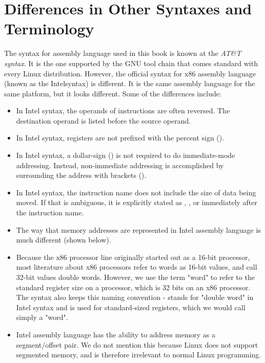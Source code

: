 \section{Differences in Other Syntaxes and Terminology}

The syntax for assembly language used in this book is known at the
\emph{AT\&T syntax}.  It is the one supported by the 
GNU tool chain that comes standard with every Linux distribution.  However,
the official syntax for x86 assembly language (known as the Intel\textregistered syntax)
is different.  It is
the same assembly language for the same platform, but it looks different.
Some of the differences include:

\begin{itemize}\item In Intel syntax, the operands of instructions are often reversed.  The destination operand is listed before the source operand. 
\item In Intel syntax, registers are not prefixed with the percent sign (\icode{\%}). 
\item In Intel syntax, a dollar-sign (\icode{\$}) is not required to do immediate-mode addressing.  Instead, non-immediate addressing is accomplished by surrounding the address with brackets (\icode{[]}). 
\item In Intel syntax, the instruction name does not include the size of data being moved.  If that is ambiguous, it is explicitly stated as , , or  immediately after the instruction name. 
\item The way that memory addresses are represented in Intel assembly language is much different (shown below). 
\item Because the x86 processor line originally started out as a 16-bit processor, most literature about x86 processors refer to words as 16-bit values, and call 32-bit values double words.  However, we use the term "word" to refer to the standard register size on a processor, which is 32 bits on an x86 processor.  The syntax also keeps this naming convention -  stands for "double word" in Intel syntax and is used for standard-sized registers, which we would call simply a "word". 
\item Intel assembly language has the ability to address memory as a segment/offset pair.  We do not mention this because Linux does not support segmented memory, and is therefore irrelevant to normal Linux programming. 
\end{itemize}

